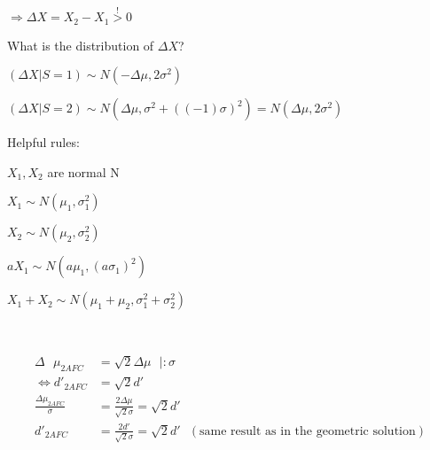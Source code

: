 \documentclass[../main/Notes.tex]{subfiles}
\begin{document}
$\Rightarrow \Delta X= X_{2}-X_{1} \stackrel{!}{>}0$


\begin{minipage}[t][3cm][t]{9.25cm}
What is the distribution of $\Delta X$?

$\left(\Delta X | S = 1\right) \sim N\left( -\Delta \mu , 2\sigma^{2}\right)$

$\left(\Delta X | S = 2\right) \sim N\left( \Delta \mu , \sigma^{2} + \left(\left( -1 \right)\sigma\right)^{2}\right) = N \left( \Delta \mu , 2\sigma^{2}\right)$
\end{minipage} 
\begin{minipage}[t][3cm][t]{6cm}
Helpful rules:

$X_{1},X_{2}$ are normal N

$X_{1} \sim N\left(\mu_{1} , \sigma_{1}^{2}\right)$

$X_{2} \sim N\left(\mu_{2} , \sigma_{2}^{2}\right)$

$aX_{1} \sim N\left(a\mu_{1} , \left(a\sigma_{1}\right)^{2}\right)$

$X_{1} + X_{2} \sim N \left( \mu_{1} + \mu_{2}, \sigma_{1}^{2} + \sigma_{2}^{2} \right)$
\end{minipage}
\\
\begin{minipage}[b][3cm][t]{3.5cm}
\end{minipage}
\begin{minipage}[b][3.5cm][t]{8cm}
\begin{align*}
& & \Delta ~~~\mu_{2AFC} & = \sqrt{2}\Delta\mu ~~~|:\sigma & &\\
& & \Leftrightarrow d'_{2AFC} & = \sqrt{2}d' & & \\
& & \frac{\Delta\mu_{2AFC}}{\sigma} & = \frac{2\Delta\mu}{\sqrt{2}\sigma} = \sqrt{2}d' & & \\
& & d'_{2AFC} & = \frac{2d'}{\sqrt{2}\sigma} = \sqrt{2}d' ~~~\left(\text{same result as in the geometric solution}\right) & &
\end{align*}
\end{minipage}
\end{document}
